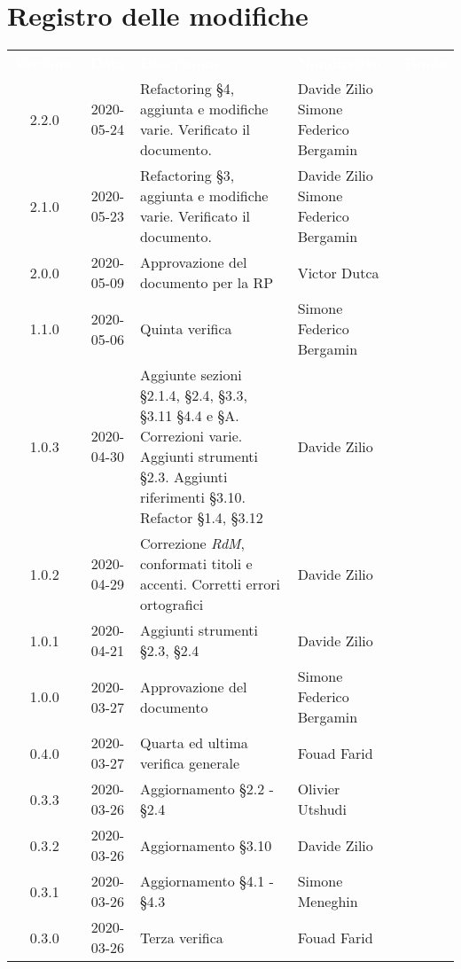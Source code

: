 \section*{Registro delle modifiche}
{
	\centering
	\begin{longtable}{ c c  C{4cm}  C{3cm}  C{3.5cm} }
		\textcolor{white}{\textbf{Versione}} & \textcolor{white}{\textbf{Data}} & \textcolor{white}{\textbf{Descrizione}} & \textcolor{white}{\textbf{Nominativo}} & \textcolor{white}{\textbf{Ruolo}}\\
		2.2.0 & 2020-05-24 & Refactoring \S 4, aggiunta e modifiche varie. Verificato il documento. & Davide Zilio \newline Simone Federico Bergamin & \adm{} \newline  \ver{} \\
	2.1.0 & 2020-05-23 & Refactoring \S 3, aggiunta e modifiche varie. Verificato il documento. & Davide Zilio \newline Simone Federico Bergamin & \adm{} \newline  \ver{} \\
	2.0.0 & 2020-05-09 & Approvazione del documento per la RP & Victor Dutca &\Res{}\\
	1.1.0 & 2020-05-06 & Quinta verifica & Simone Federico Bergamin &\ver{}\\
	1.0.3 & 2020-04-30 & Aggiunte sezioni \S 2.1.4, \S 2.4, \S 3.3, \S 3.11 \S 4.4 e \S A. Correzioni varie. Aggiunti strumenti \S 2.3. Aggiunti riferimenti \S 3.10. Refactor \S 1.4, \S 3.12 & Davide Zilio &\adm{} \\
	1.0.2 & 2020-04-29 & Correzione \textit{RdM}, conformati titoli e accenti. Corretti errori ortografici & Davide Zilio &\adm{} \\
	1.0.1 & 2020-04-21 & Aggiunti strumenti \S 2.3, \S 2.4 & Davide Zilio &\adm{} \\	
    1.0.0 & 2020-03-27 & Approvazione del documento & Simone Federico Bergamin &\Res{} \\
    	0.4.0 & 2020-03-27 & Quarta ed ultima verifica generale & Fouad Farid &\ver{}\\
    	0.3.3 & 2020-03-26 & Aggiornamento \S 2.2 - \S 2.4 & Olivier Utshudi &\adm{}\\
		0.3.2 & 2020-03-26 & Aggiornamento \S 3.10 & Davide Zilio &\adm{}\\
		0.3.1 & 2020-03-26 & Aggiornamento \S 4.1 - \S 4.3  & Simone Meneghin &\adm{}\\
		0.3.0 & 2020-03-26 & Terza verifica & Fouad Farid &\ver{}\\

\end{longtable}}
